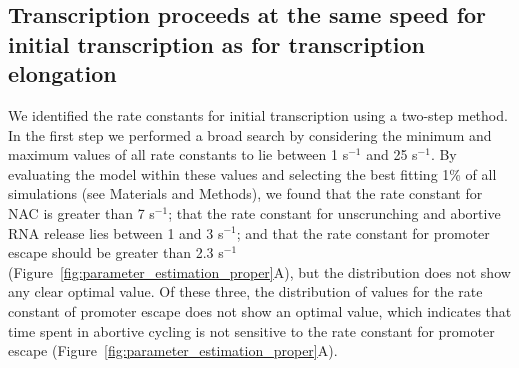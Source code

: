 %
\subsection{Transcription proceeds at the same speed for initial transcription
as for transcription elongation}

We identified the rate constants for initial transcription using a two-step
method. In the first step we performed a broad search by considering the
minimum and maximum values of all rate constants to lie between 1 s$^{-1}$ and
25 s$^{-1}$. By evaluating the model within these values and selecting the
best fitting 1\% of all simulations (see Materials and Methods), we found that
the rate constant for NAC is greater than 7 s$^{-1}$; that the rate
constant for unscrunching and abortive RNA release lies between 1 and 3
s$^{-1}$; and that the rate constant for promoter escape should be greater
than 2.3 s$^{-1}$ (Figure~\ref{fig:parameter_estimation_proper}A), but the
distribution does not show any clear optimal value. Of these three, the
distribution of values for the rate constant of promoter escape does not
show an optimal value, which indicates that time spent in abortive cycling is
not sensitive to the rate constant for promoter escape
(Figure~\ref{fig:parameter_estimation_proper}A).

